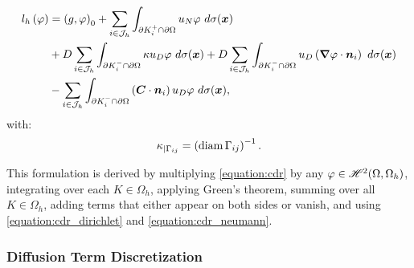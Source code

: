 \begin{align}
    l_h \left( \varphi \right)  &= \left( g, \varphi \right)_0 + \sum_{i \in \mathcal{J}_h} \int_{\partial K_i^+ \cap \partial \Omega} u_N \varphi ~ d \sigma(\bm{x}) \label{equation:cdr_lh} \\
    &+ D \sum_{i \in \mathcal{J}_h} \int_{\partial K_i^- \cap \partial \Omega} \kappa u_D \varphi ~ d \sigma(\bm{x}) + D \sum_{i \in \mathcal{J}_h} \int_{\partial K_i^- \cap \partial \Omega} u_D \left( \bm{\nabla} \varphi \cdot \bm{n}_i \right) ~ d \sigma(\bm{x}) \notag \\
    &- \sum_{i \in \mathcal{J}_h} \int_{\partial K_i^- \cap \partial \Omega} \left( \bm{C} \cdot \bm{n}_i \right) u_D \varphi ~ d \sigma(\bm{x}) \notag,
\end{align}
with:
\begin{gather}
    \kappa_{\mid \Gamma_{ij}} = \left( \operatorname*{diam} \Gamma_{ij} \right)^{-1}.
\end{gather}

This formulation is derived by multiplying \cref{equation:cdr} by any $\varphi \in \mathscr{H}^{2}(\Omega, \Omega_h)$, integrating over each $K \in \Omega_h$, applying Green's theorem, summing over all $K \in \Omega_h$, adding terms that either appear on both sides or vanish, and using \cref{equation:cdr_dirichlet} and \cref{equation:cdr_neumann}. %

\newpage
\subsubsection{Diffusion Term Discretization}

